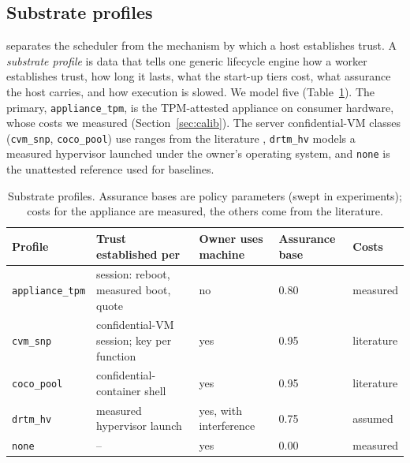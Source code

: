 \subsection{Substrate profiles}
\label{sec:substrates}
\voss{} separates the scheduler from the mechanism by which a host establishes trust. A \emph{substrate profile} is data that tells one generic lifecycle
engine how a worker establishes trust, how long it lasts, what the start-up tiers cost, what assurance the host carries, and how execution is slowed. We
model five (Table~\ref{tab:substrates}). The primary, \texttt{appliance\_tpm}, is the TPM-attested appliance on consumer hardware, whose costs we measured
(Section~\ref{sec:calib}). The server confidential-VM classes (\texttt{cvm\_snp}, \texttt{coco\_pool}) use ranges from the
literature \cite{amd2020snp,misono2025cvm,holmes2024severifast,li2023bifrost}, \texttt{drtm\_hv} models a measured hypervisor launched under the
owner's operating system, and \texttt{none} is the unattested reference used for baselines.

\begin{table}[t]
\caption{Substrate profiles. Assurance bases are policy parameters (swept in experiments); costs for the appliance are measured, the others come from the literature.}
\label{tab:substrates}
\centering\scriptsize
\setlength{\tabcolsep}{2.5pt}
\begin{tabular}{@{}p{2.1cm}p{2.2cm}p{1.35cm}p{0.95cm}p{1.1cm}@{}}
\toprule
Profile & Trust established per & Owner uses machine & Assurance base & Costs \\
\midrule
\texttt{appliance\_tpm} & session: reboot, measured boot, quote & no & 0.80 & measured \\
\texttt{cvm\_snp} & confidential-VM session; key per function & yes & 0.95 & literature \\
\texttt{coco\_pool} & confidential-container shell & yes & 0.95 & literature \\
\texttt{drtm\_hv} & measured hypervisor launch & yes, with interference & 0.75 & assumed \\
\texttt{none} & -- & yes & 0.00 & measured \\
\bottomrule
\end{tabular}
\end{table}
